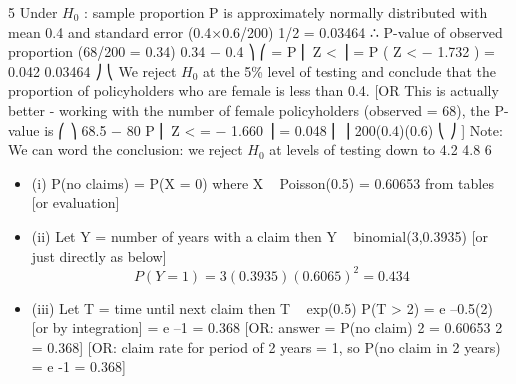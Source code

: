 \documentclass[a4paper,12pt]{article}
\begin{document}
5
Under $H_0$ : sample proportion P is approximately normally distributed with mean 0.4
and standard error (0.4×0.6/200) 1/2 = 0.03464
∴ P-value of observed proportion (68/200 = 0.34)
0.34 − 0.4 ⎞
⎛
= P ⎜ Z <
⎟ = P ( Z < − 1.732 ) = 0.042
0.03464 ⎠
⎝
We reject $H_0$ at the 5\% level of testing and conclude that the proportion of policyholders who are female is less than 0.4.
[OR This is actually better - working with the number of female policyholders (observed = 68), the P-value is
⎛
⎞
68.5 − 80
P ⎜ Z <
= − 1.660 ⎟ = 0.048
⎜
⎟
200(0.4)(0.6)
⎝
⎠
]
Note: We can word the conclusion: we reject $H_0$ at levels of testing down to 4.2%
4.8%
6
\begin{itemize}
\item (i) P(no claims) = P(X = 0) where X ~ Poisson(0.5)
= 0.60653 from tables [or evaluation]
\item (ii) Let Y = number of years with a claim
then Y ~ binomial(3,0.3935) [or just directly as below]
\[P(Y = 1) = 3(0.3935)(0.6065)^2 = 0.434\]
\item (iii)
Let T = time until next claim
then T ~ exp(0.5)
P(T > 2) = e –0.5(2) [or by integration]
= e –1 = 0.368
[OR: answer = {P(no claim)} 2 = 0.60653 2 = 0.368]
[OR: claim rate for period of 2 years = 1, so P(no claim in 2 years)
= e -1 = 0.368]
\end{itemize}
\end{document}
